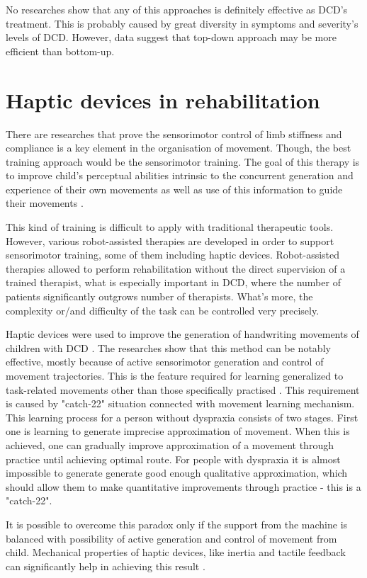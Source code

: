No researches show that any of this approaches is definitely effective as DCD's treatment. This is probably caused by great diversity in symptoms and severity's levels of DCD. However, data suggest that top-down approach may be more efficient than bottom-up.


\section{Haptic devices in rehabilitation}
There are researches that prove the sensorimotor control of limb stiffness and compliance is a key element in the organisation of movement. Though, the best training approach would be the sensorimotor training. The goal of this therapy is to improve child's perceptual abilities intrinsic to the concurrent generation and experience of their own movements as well as use of this information to guide their movements \cite{13}.

This kind of training is difficult to apply with traditional therapeutic tools. However, various robot-assisted therapies are developed in order to support sensorimotor training, some of them including haptic devices. Robot-assisted therapies allowed to perform rehabilitation without the direct supervision of a trained therapist, what is especially important in DCD, where the number of patients significantly outgrows number of therapists. What's more, the complexity or/and difficulty of the task can be controlled very precisely. 

Haptic devices were used to improve the generation of handwriting movements of children with DCD \cite{9}. The researches show that this method can be notably effective, mostly because of active sensorimotor generation and control of movement trajectories. This is the feature required for learning generalized to task-related movements other than those specifically practised \cite{13}. This requirement is caused by "catch-22" situation connected with movement learning mechanism. This learning process for a person without dyspraxia consists of two stages. First one is learning to generate imprecise approximation of movement. When this is achieved, one can gradually improve approximation of a movement through practice until achieving optimal route. For people with dyspraxia it is almost impossible to generate generate good enough qualitative approximation, which should allow them to make quantitative improvements through practice - this is a "catch-22". 

It is possible to overcome this paradox only if the support from the machine is balanced with possibility of active generation and control of movement from child. Mechanical properties of haptic devices, like inertia and tactile feedback can significantly help in achieving this result \cite{13}.
 
